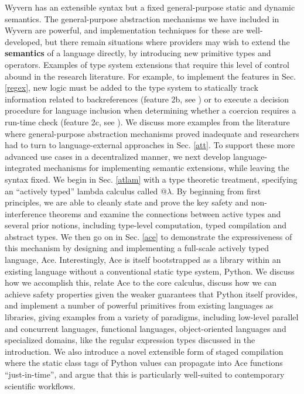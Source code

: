 Wyvern has an extensible syntax but a fixed general-purpose static and dynamic semantics. The general-purpose abstraction mechanisms we have included in Wyvern are powerful, and implementation techniques for these are well-developed, but there remain situations where providers may wish to extend the \textbf{semantics} of a language directly, by introducing new primitive types and operators. Examples of type system extensions that require this level of control abound in the research literature. For example, to implement the features in Sec. \ref{regex}, new logic must be added to the type system to statically track information related to backreferences (feature 2b, see \cite{spishak2012type}) or to execute a decision procedure for language inclusion when determining whether a coercion requires a run-time check (feature 2c, see \cite{fulton-thesis}). We discuss more examples from the literature where general-purpose abstraction mechanisms proved inadequate and researchers had to turn to language-external approaches in Sec. \ref{att}. To support these more advanced use cases in a decentralized manner, we next develop language-integrated mechanisms for implementing semantic extensions, while leaving the syntax fixed. We begin in Sec. \ref{atlam} with a type theoretic treatment, specifying an ``actively typed'' lambda calculus called @$\lambda$. By beginning from first principles, we are able to cleanly state and prove the key safety and non-interference theorems and examine the connections between active types and several prior notions, including type-level computation, typed compilation and abstract types. We then go on in Sec. \ref{ace} to demonstrate the expressiveness of this mechanism by designing and implementing a full-scale actively typed language, Ace. Interestingly, Ace is itself bootstrapped as a library within an existing language without a conventional static type system, Python. We discuss how we accomplish this, relate Ace to the core calculus, discuss how we can achieve  safety properties given the weaker guarantees that Python itself provides, and implement a number of powerful primitives from existing languages as libraries, giving examples from a variety of paradigms, including low-level parallel and concurrent languages, functional languages, object-oriented languages and specialized domains, like the regular expression types discussed in the introduction. We also introduce a novel extensible form of staged compilation where the static class tags of Python values can propagate into Ace functions ``just-in-time'', and argue that this is particularly well-suited to contemporary scientific workflows.

